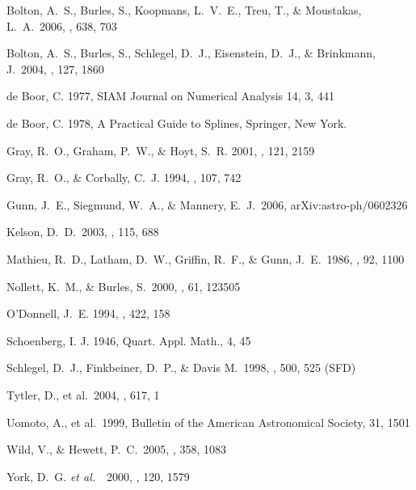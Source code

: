 \documentclass[12pt,preprint]{aastex}
\newcommand{\etal}{{\it et al.}~}
\begin{document}
\begin{thebibliography}{DUM}

 Bolton, A.~S., Burles, 
S., Koopmans, L.~V.~E., Treu, T., \& Moustakas, L.~A.\ 2006, \apj, 638, 703 

 Bolton, A.~S., Burles, 
S., Schlegel, D.~J., Eisenstein, D.~J., \& Brinkmann, J.\ 2004, \aj, 127, 
1860 

de Boor, C. 1977,  SIAM Journal on Numerical Analysis 14, 3, 441

de Boor, C. 1978, A Practical Guide to Splines, Springer, New York.

Gray, R.\ O., Graham, P.\ W., \& Hoyt, S.\ R. 2001, \aj, 121, 2159

Gray, R.\ O., \& Corbally, C.\ J. 1994, \aj, 107, 742

 Gunn, J.~E., Siegmund, 
W.~A., \& Mannery, E.~J.\ 2006, arXiv:astro-ph/0602326 

 Kelson, D.~D.\ 2003, \pasp, 
115, 688 

\bibitem[Mathieu \etal\ (1896)]{1986AJ...92...1100} Mathieu, R.~D.,
Latham, D.~W., Griffin, R.~F., \& Gunn, J.~E.\ 1986, \aj, 92, 1100

 Nollett, K.~M., \& 
Burles, S.\ 2000, \prd, 61, 123505 
 
O'Donnell, J.\ E. 1994, \apj, 422, 158

\bibitem[Schoenberg 1946]{} Schoenberg, I. J. 1946, Quart. Appl. Math., 4, 45

Schlegel, D.\ J., Finkbeiner, D.\ P., \& Davis M.\ 1998, \apj, 500, 525 (SFD)

 Tytler, D., et al.\ 
2004, \apj, 617, 1 

 Uomoto, A., et al.\ 
1999, Bulletin of the American Astronomical Society, 31, 1501 

 Wild, V., \& Hewett, 
P.~C.\ 2005, \mnras, 358, 1083 
  
York, D.\ G. \etal\ 2000, \aj, 120, 1579

\end{thebibliography}
\clearpage
\end{document}
